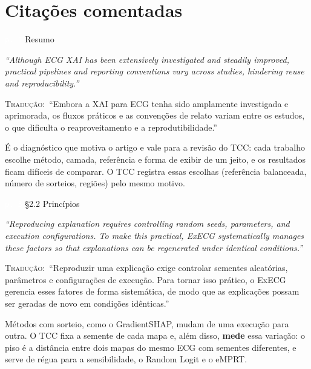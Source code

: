 \documentclass[11pt,a4paper]{article}
\newcommand{\pagechip}[1]{{\setlength{\fboxsep}{1.5pt}\colorbox{cAcc}{\textcolor{white}{\scriptsize\texttt{#1}}}}}
\newenvironment{origquote}{\par\itshape\small}{\par}
\newenvironment{tradquote}{\par\small\textsc{Tradução:}\ }{\par}
\newcommand{\explab}[1]{\par\smallskip{\small\color{cAcc}\textbf{\MakeUppercase{#1}}}\par}
\begin{document}
\section{Citações comentadas}

\begin{citacard}{\pagechip{p. 1} Resumo}
\begin{origquote}“Although ECG XAI has been extensively investigated and steadily improved, practical pipelines and reporting conventions vary across studies, hindering reuse and reproducibility.”\end{origquote}
\begin{tradquote}“Embora a XAI para ECG tenha sido amplamente investigada e aprimorada, os fluxos práticos e as convenções de relato variam entre os estudos, o que dificulta o reaproveitamento e a reprodutibilidade.”\end{tradquote}
\explab{Explicação}
É o diagnóstico que motiva o artigo e vale para a revisão do TCC: cada trabalho escolhe método, camada, referência e forma de exibir de um jeito, e os resultados ficam difíceis de comparar. O TCC registra essas escolhas (referência balanceada, número de sorteios, regiões) pelo mesmo motivo.
\end{citacard}

\begin{citacard}{\pagechip{p. 3} §2.2 Princípios}
\begin{origquote}“Reproducing explanation requires controlling random seeds, parameters, and execution configurations. To make this practical, ExECG systematically manages these factors so that explanations can be regenerated under identical conditions.”\end{origquote}
\begin{tradquote}“Reproduzir uma explicação exige controlar sementes aleatórias, parâmetros e configurações de execução. Para tornar isso prático, o ExECG gerencia esses fatores de forma sistemática, de modo que as explicações possam ser geradas de novo em condições idênticas.”\end{tradquote}
\explab{Explicação}
Métodos com sorteio, como o GradientSHAP, mudam de uma execução para outra. O TCC fixa a semente de cada mapa e, além disso, \textbf{mede} essa variação: o piso é a distância entre dois mapas do mesmo ECG com sementes diferentes, e serve de régua para a sensibilidade, o Random Logit e o eMPRT.
\end{citacard}
\end{document}
